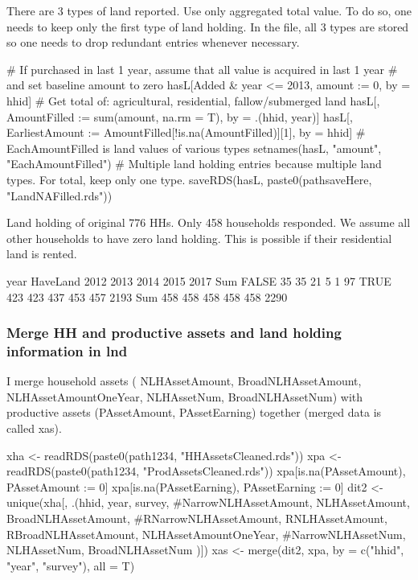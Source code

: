 There are 3 types of land reported. Use only aggregated total value. To do so, one needs to keep only the first type of land holding. In the file, all 3 types are stored so one needs to drop redundant entries whenever necessary.
\begin{Schunk}
\begin{Sinput}
# If purchased in last 1 year, assume that all value is acquired in last 1 year 
# and set baseline amount to zero
hasL[Added & year <= 2013, amount := 0, by = hhid]
# Get total of: agricultural, residential, fallow/submerged land
hasL[, AmountFilled := sum(amount, na.rm = T), by = .(hhid, year)]
hasL[, EarliestAmount := AmountFilled[!is.na(AmountFilled)][1], by = hhid]
# EachAmountFilled is land values of various types
setnames(hasL, "amount", "EachAmountFilled")
# Multiple land holding entries because multiple land types. For total, keep only one type.
saveRDS(hasL, paste0(pathsaveHere, "LandNAFilled.rds"))
\end{Sinput}
\end{Schunk}
Land holding of original 776 HHs. Only 458 households responded. We assume all other households to have zero land holding. This is possible if their residential land is rented.
\begin{Schunk}
\begin{Soutput}
        year
HaveLand 2012 2013 2014 2015 2017  Sum
   FALSE   35   35   21    5    1   97
   TRUE   423  423  437  453  457 2193
   Sum    458  458  458  458  458 2290
\end{Soutput}
\end{Schunk}

\subsubsection{Merge HH and productive assets and land holding information in lnd}

I merge household assets (\textsf{%
NLHAssetAmount, BroadNLHAssetAmount,
 NLHAssetAmountOneYear, %
 NLHAssetNum, BroadNLHAssetNum}) with productive assets (\textsf{PAssetAmount, PAssetEarning}) together (merged data is called \textsf{xas}).
\begin{Schunk}
\begin{Sinput}
xha <- readRDS(paste0(path1234, "HHAssetsCleaned.rds"))
xpa <- readRDS(paste0(path1234, "ProdAssetsCleaned.rds"))
xpa[is.na(PAssetAmount), PAssetAmount := 0]
xpa[is.na(PAssetEarning), PAssetEarning := 0]
dit2 <- unique(xha[, .(hhid, year, survey, 
  #NarrowNLHAssetAmount, 
  NLHAssetAmount, BroadNLHAssetAmount,
  #RNarrowNLHAssetAmount, RNLHAssetAmount, RBroadNLHAssetAmount,
  NLHAssetAmountOneYear, 
  #NarrowNLHAssetNum, 
  NLHAssetNum, BroadNLHAssetNum
  )])
xas <- merge(dit2, xpa, by = c("hhid", "year", "survey"), all = T)
\end{Sinput}
\end{Schunk}

